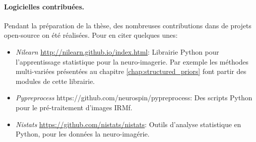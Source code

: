 \paragraph{Logicielles contribuées.}
Pendant la préparation de la thèse, des nombreuses contributions dans de projets open-source on été réalisées. Pour en citer quelques unes:
\begin{itemize}
\item \textit{Nilearn} \url{http://nilearn.github.io/index.html}: Librairie Python pour l'apprentissage statistique pour la neuro-imagerie. Par exemple les méthodes multi-variées présentées au chapitre
  \ref{chap:structured_priors} font partir des modules de cette librairie.
  \item \textit{Pypreprocess} https://github.com/neurospin/pypreprocess: Des scripts Python pour le pré-traitement d'images IRMf.
  \item \textit{Nistats} \url{https://github.com/nistats/nistats}: Outils d'analyse statistique en Python, pour les données la neuro-imagérie.
\end{itemize}
    

  


